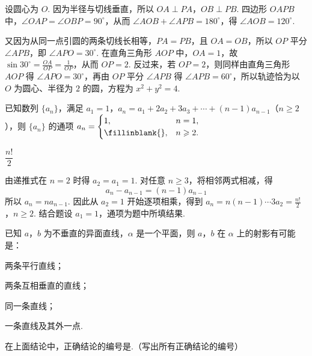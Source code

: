 \begin{solution}
设圆心为 \(O\). 因为半径与切线垂直，所以 \(OA\perp PA\)，\(OB\perp PB\). 四边形 \(OAPB\) 中，\(\angle OAP=\angle OBP=90^{\circ}\)，从而 \(\angle AOB+\angle APB=180^{\circ}\)，得 \(\angle AOB=120^{\circ}\).

又因为从同一点引圆的两条切线长相等，\(PA=PB\)，且 \(OA=OB\)，所以 \(OP\) 平分 \(\angle APB\)，即 \(\angle APO=30^{\circ}\). 在直角三角形 \(AOP\) 中，\(OA=1\)，故 \(\sin30^{\circ}=\frac{OA}{OP}=\frac1{OP}\)，从而 \(OP=2\). 反过来，若 \(OP=2\)，则同样由直角三角形 \(AOP\) 得 \(\angle APO=30^{\circ}\)，再由 \(OP\) 平分 \(\angle APB\) 得 \(\angle APB=60^{\circ}\)，所以轨迹恰为以 \(O\) 为圆心、半径为 \(2\) 的圆，方程为 \(x^2+y^2=4\).
\end{solution}

\begin{problem}
已知数列 \(\{a_{n}\}\)，满足 \(a_{1} = 1\)，\(a_{n} = a_{1} + 2a_{2} + 3a_{3} + \cdots + (n - 1)a_{n-1}\)（\(n \geqslant 2\)），则 \(\{a_{n}\}\) 的通项 \(a_{n} = \begin{cases}
1, & n = 1,\\
\fillinblank{}, & n \geqslant 2.
\end{cases}\)
\end{problem}

\begin{answer}
\(\dfrac{n!}{2}\)
\end{answer}

\begin{solution}
由递推式在 \(n=2\) 时得 \(a_2=a_1=1\). 对任意 \(n\geqslant3\)，将相邻两式相减，得
\[
a_n-a_{n-1}=(n-1)a_{n-1}
\]
所以 \(a_n=na_{n-1}\). 因此从 \(a_2=1\) 开始逐项相乘，得到
\(a_n=n(n-1)\cdots3a_2=\frac{n!}{2}\)，\(n\geqslant2\).
结合题设 \(a_1=1\)，通项为题中所填结果.
\end{solution}

\begin{problem}
已知 \(a\)，\(b\) 为不垂直的异面直线，\(\alpha\) 是一个平面，则 \(a\)，\(b\) 在 \(\alpha\) 上的射影有可能是：

\begin{circlelist}
\item 两条平行直线；
\item 两条互相垂直的直线；
\item 同一条直线；
\item 一条直线及其外一点.
\end{circlelist}

在上面结论中，正确结论的编号是\fillinblank{}.（写出所有正确结论的编号）
\end{problem}

